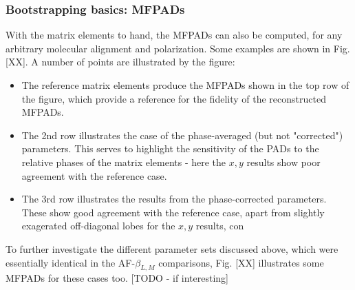 \subsubsection{Bootstrapping basics: MFPADs}

With the matrix elements to hand, the MFPADs can also be computed, for any arbitrary molecular alignment and polarization. Some examples are shown in Fig. [XX]. A number of points are illustrated by the figure:

\begin{itemize}
\item The reference matrix elements produce the MFPADs shown in the top row of the figure, which provide a reference for the fidelity of the reconstructed MFPADs.
\item The 2nd row illustrates the case of the phase-averaged (but not "corrected") parameters. This serves to highlight the sensitivity of the PADs to the relative phases of the matrix elements - here the $x,y$ results show poor agreement with the reference case.
\item The 3rd row illustrates the results from the phase-corrected parameters. These show good agreement with the reference case, apart from slightly exagerated off-diagonal lobes for the $x,y$ results, con
\end{itemize}

To further investigate the different parameter sets discussed above, which were essentially identical in the AF-$\beta_{L,M}$ comparisons, Fig. [XX] illustrates some MFPADs for these cases too. [TODO - if interesting]